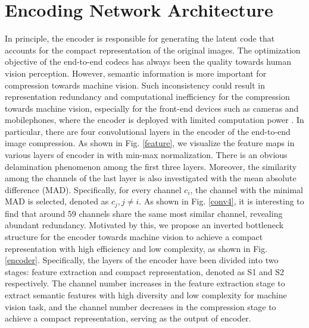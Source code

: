 \documentclass[transmag]{IEEEtran}
\begin{document}
\section{Encoding Network Architecture}
In principle, the encoder is responsible for generating the latent code that accounts for the compact representation of the original images. The optimization objective of the end-to-end codecs has always been the quality towards human vision perception. However, semantic information is more important for compression towards machine vision. Such inconsistency could result in representation redundancy and computational inefficiency for the compression towards machine vision, especially for the front-end devices such as cameras and mobilephones, where the encoder is deployed with limited computation power  \cite{chen2020toward}. In particular, there are four convolutional layers in the encoder of the end-to-end image compression. As shown in Fig. \ref{feature}, we visualize the feature maps in various layers {of encoder in \cite{minnen2018joint}} with min-max normalization. {There is an obvious delamination phenomenon among the first three layers. Moreover, the similarity among the channels of the last layer is also investigated with the mean absolute difference (MAD). Specifically, for every channel $c_{i}$, the channel with the minimal MAD is 
selected, denoted as $c_{j}, j\neq i$.} As shown in Fig. \ref{conv4}, it is interesting to find that around 59 channels share the same most similar channel, revealing abundant redundancy.
Motivated by this, we propose an inverted bottleneck structure for the encoder towards machine vision to achieve a compact representation with high efficiency and low complexity, as shown in Fig. \ref{encoder}. Specifically, the layers of the encoder have been divided into two stages: feature extraction and compact representation{, denoted as S1 and S2 respectively}. The channel number increases in the feature extraction stage to extract semantic features with high diversity {and low complexity} for machine vision task, and the channel number decreases in the compression stage to achieve a compact representation, serving as the output of encoder.
\end{document}

